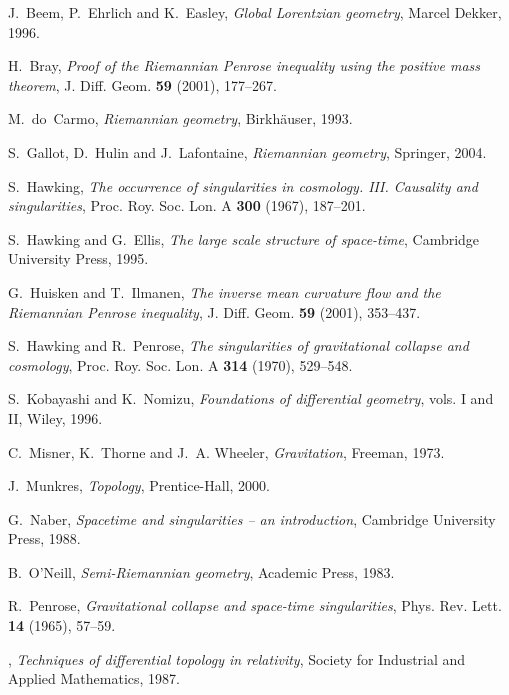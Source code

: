\documentclass[12pt]{amsart}
\theoremstyle{definition}
\theoremstyle{remark}
\begin{document}
 
\begin{thebibliography}{MTW73}

J.~Beem, P.~Ehrlich and K.~Easley, \emph{Global Lorentzian geometry}, Marcel
  Dekker, 1996.

H.~Bray, \emph{Proof of the Riemannian Penrose inequality using the positive
  mass theorem}, J. Diff. Geom. \textbf{59} (2001), 177--267.

M.~do~Carmo, \emph{Riemannian geometry}, Birkh\"auser, 1993.

S.~Gallot, D.~Hulin and J.~Lafontaine, \emph{Riemannian geometry}, Springer,
  2004.

S.~Hawking, \emph{The occurrence of singularities in cosmology. III. Causality
  and singularities}, Proc. Roy. Soc. Lon. A \textbf{300} (1967), 187--201.

S.~Hawking and G.~Ellis, \emph{The large scale structure of space-time},
  Cambridge University Press, 1995.

G.~Huisken and T.~Ilmanen, \emph{The inverse mean curvature flow and the
  Riemannian Penrose inequality}, J. Diff. Geom. \textbf{59} (2001), 353--437.

S.~Hawking and R.~Penrose, \emph{The singularities of gravitational collapse
  and cosmology}, Proc. Roy. Soc. Lon. A \textbf{314} (1970), 529--548.

S.~Kobayashi and K.~Nomizu, \emph{Foundations of differential geometry}, vols. I
  and II, Wiley, 1996.

C.~Misner, K.~Thorne and J.~A. Wheeler, \emph{Gravitation}, Freeman, 1973.

J.~Munkres, \emph{Topology}, Prentice-Hall, 2000.

G.~Naber, \emph{Spacetime and singularities -- an introduction}, Cambridge
  University Press, 1988.

B.~O'Neill, \emph{Semi-Riemannian geometry}, Academic Press, 1983.

R.~Penrose, \emph{Gravitational collapse and space-time singularities}, Phys.
  Rev. Lett. \textbf{14} (1965), 57--59.

\bysame, \emph{Techniques of differential topology in relativity}, Society for
  Industrial and Applied Mathematics, 1987.


\end{thebibliography}
\end{document}
